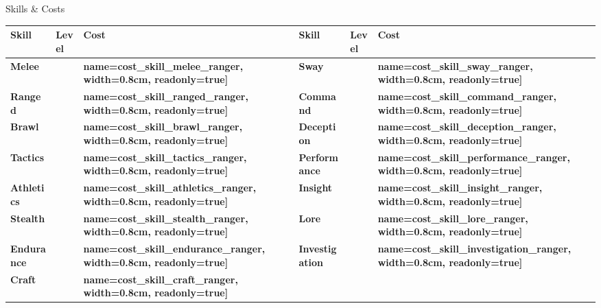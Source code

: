 \documentclass[10pt]{article}
\newcommand{\skilldots}[1]{%
  \TextField[
    name=#1,
    bordercolor={0 0 0},
    backgroundcolor={255 255 255},
    readonly=false,
    width=1.5cm,
    height=0.45cm,
    maxlen=1,
    chars=2,
    align=0,
    default=0
  ]{}%
  \hspace{-0.2em}%
  \raisebox{0.4ex}{%
    \small%
    \textcolor{gray}{%
      \(\bigcirc\)\(\bigcirc\)\(\bigcirc\)\(\bigcirc\)\(\bigcirc\)%
    }%
  }%
}
\newcommand{\tf}[1]{\TextField[#1]{}}
\begin{document}
\begin{Form}
\begin{minipage}[t]{0.48\linewidth}
    \begin{charbox}{Skills \& Costs}
        \begin{tabular}{>{\bfseries}p{2.5cm} >{\bfseries}p{1.5cm} >{\bfseries}p{1.5cm} >{\bfseries}p{2.5cm} >{\bfseries}p{1.5cm} >{\bfseries}p{1.5cm}}
            \toprule
            \textbf{Skill} & \textbf{Level} & \textbf{Cost} & \textbf{Skill} & \textbf{Level} & \textbf{Cost} \\
            \midrule
            Melee & \skilldots{skill_melee_ranger} & \tf[name=cost_skill_melee_ranger, width=0.8cm, readonly=true]{} & 
            Sway & \skilldots{skill_sway_ranger} & \tf[name=cost_skill_sway_ranger, width=0.8cm, readonly=true]{} \\
            Ranged & \skilldots{skill_ranged_ranger} & \tf[name=cost_skill_ranged_ranger, width=0.8cm, readonly=true]{} & 
            Command & \skilldots{skill_command_ranger} & \tf[name=cost_skill_command_ranger, width=0.8cm, readonly=true]{} \\
            Brawl & \skilldots{skill_brawl_ranger} & \tf[name=cost_skill_brawl_ranger, width=0.8cm, readonly=true]{} & 
            Deception & \skilldots{skill_deception_ranger} & \tf[name=cost_skill_deception_ranger, width=0.8cm, readonly=true]{} \\
            Tactics & \skilldots{skill_tactics_ranger} & \tf[name=cost_skill_tactics_ranger, width=0.8cm, readonly=true]{} & 
            Performance & \skilldots{skill_performance_ranger} & \tf[name=cost_skill_performance_ranger, width=0.8cm, readonly=true]{} \\
            Athletics & \skilldots{skill_athletics_ranger} & \tf[name=cost_skill_athletics_ranger, width=0.8cm, readonly=true]{} & 
            Insight & \skilldots{skill_insight_ranger} & \tf[name=cost_skill_insight_ranger, width=0.8cm, readonly=true]{} \\
            Stealth & \skilldots{skill_stealth_ranger} & \tf[name=cost_skill_stealth_ranger, width=0.8cm, readonly=true]{} & 
            Lore & \skilldots{skill_lore_ranger} & \tf[name=cost_skill_lore_ranger, width=0.8cm, readonly=true]{} \\
            Endurance & \skilldots{skill_endurance_ranger} & \tf[name=cost_skill_endurance_ranger, width=0.8cm, readonly=true]{} & 
            Investigation & \skilldots{skill_investigation_ranger} & \tf[name=cost_skill_investigation_ranger, width=0.8cm, readonly=true]{} \\
            Craft & \skilldots{skill_craft_ranger} & \tf[name=cost_skill_craft_ranger, width=0.8cm, readonly=true]{} & 

\end{tabular}
\end{charbox}
\end{minipage}
\end{Form}
\end{document}
